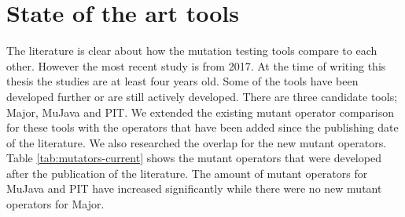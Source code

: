 \documentclass[../main]{subfiles}
\begin{document}
\section{State of the art tools}
The literature is clear about how the mutation testing tools compare to each other.
However the most recent study is from 2017.
At the time of writing this thesis the studies are at least four years old. 
Some of the tools have been developed further or are still actively developed\cite{pit-releases,Major}.
\newline
There are three candidate tools; Major,  MuJava and PIT.
We extended the existing mutant operator comparison for these tools with the operators that have been added since the publishing date of the literature.
We also researched the overlap for the new mutant operators.
\newpage
Table \ref{tab:mutators-current} shows the mutant operators that were developed after the publication of the literature. The amount of mutant operators for  MuJava and PIT have increased significantly while there were no new mutant operators for Major.
\end{document}
